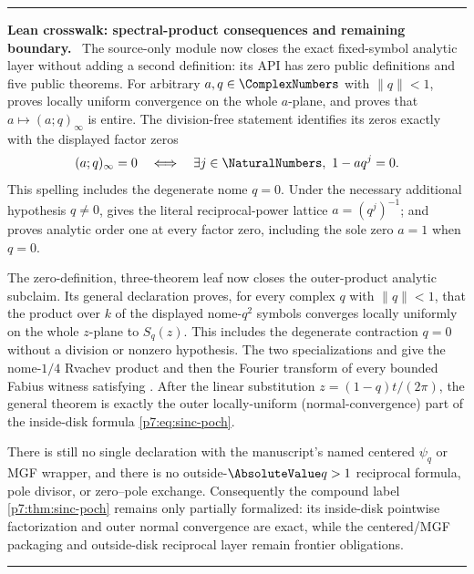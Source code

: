 \documentclass[11pt,oneside]{article}
\numberwithin{equation}{section}
\theoremstyle{definition}
\theoremstyle{remark}
\newenvironment{statusbox}[1]{%
  \par\medskip\noindent\begin{center}\begin{minipage}{0.94\textwidth}%
  \color{linkblue}\hrule\vspace{0.65em}%
  \color{black}\textbf{\color{linkblue}#1.}\ }{%
  \par\vspace{0.65em}\color{linkblue}\hrule
  \end{minipage}\end{center}\medskip}
\begin{document}
\begin{statusbox}{Lean crosswalk: spectral-product consequences and remaining boundary}
The source-only module  now closes the exact
fixed-symbol analytic layer without adding a second definition: its API has
zero public definitions and five public theorems.  For arbitrary
$a,q\in\ComplexNumbers$ with $\lVert q\rVert<1$,
 proves locally uniform
convergence on the whole $a$-plane, and
 proves that
$a\mapsto(a;q)_\infty$ is entire.  The division-free statement
 identifies its zeros exactly with
the displayed factor zeros
\[
 (a;q)_\infty=0
 \quad\Longleftrightarrow\quad
 \exists j\in\NaturalNumbers,\ 1-aq^j=0.
\]
This spelling includes the degenerate nome $q=0$.  Under the necessary
additional hypothesis $q\ne0$,
 gives the literal
reciprocal-power lattice $a=(q^j)^{-1}$; and
 proves analytic
order one at every factor zero, including the sole zero $a=1$ when $q=0$.

The zero-definition, three-theorem leaf
 now closes the outer-product
analytic subclaim.  Its general declaration
proves, for every complex $q$ with $\lVert q\rVert<1$, that the product over
$k$ of the displayed nome-$q^2$ symbols converges locally uniformly on the
whole $z$-plane to $S_q(z)$.  This includes the degenerate contraction $q=0$
without a division or nonzero hypothesis.  The two specializations
and
give the nome-$1/4$ Rvachev product and then the Fourier transform of every
bounded Fabius witness satisfying .  After the linear
substitution $z=(1-q)t/(2\pi)$, the general theorem is exactly the outer
locally-uniform (normal-convergence) part of the inside-disk formula
\eqref{p7:eq:sinc-poch}.

There is still no single declaration with the manuscript's named centered
$\psi_q$ or MGF wrapper, and there is no outside-$\AbsoluteValue q>1$
reciprocal formula, pole divisor, or zero--pole exchange.  Consequently the
compound label \cref{p7:thm:sinc-poch} remains only partially formalized: its
inside-disk pointwise factorization and outer normal convergence are exact,
while the centered/MGF packaging and outside-disk reciprocal layer remain
frontier obligations.
\end{statusbox}
\end{document}
